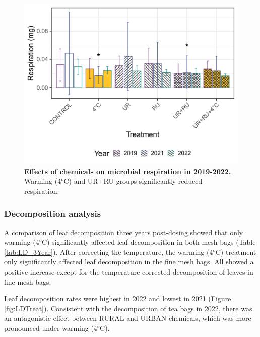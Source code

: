 \documentclass[11pt, a4paper]{article}
\begin{document}
\begin{spacing}{1.5}
\begin{figure}[H]
    \centering
    \includegraphics[scale=0.55]{./Figures/MicroResp3Year_bar_corrected}
    \caption{\textbf{Effects of chemicals on microbial respiration in 2019-2022.} Warming (4°C) and UR+RU groups significantly reduced respiration.}
    \label{fig:MR3Year}
\end{figure}

\subsubsection{Decomposition analysis}

A comparison of leaf decomposition three years post-dosing showed that only warming (4°C) significantly affected leaf decomposition in both mesh bags (Table \ref{tab:LD_3Year}). After correcting the temperature, the warming (4°C) treatment only significantly affected leaf decomposition in the fine mesh bags. All showed a positive increase except for the temperature-corrected decomposition of leaves in fine mesh bags.

Leaf decomposition rates were highest in 2022 and lowest in 2021 (Figure \ref{fig:LDTreat}). Consistent with the decomposition of tea bags in 2022, there was an antagonistic effect between RURAL and URBAN chemicals, which was more pronounced under warming (4°C).


\end{spacing}
\end{document}
